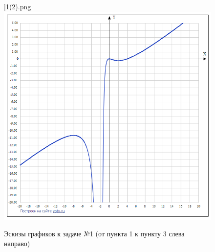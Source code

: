 \documentclass[a4paper,12pt]{article}
\begin{document}
\begin{enumerate}
\begin{figure}[h!]
     		]{1(2).png}
     		\includegraphics[scale=0.35]{1(3).png}
     		\caption{Эскизы графиков к задаче №1 (от пункта 1 к пункту 3 слева направо)}
		\end{figure}
     	

\end{enumerate}
\end{document}
